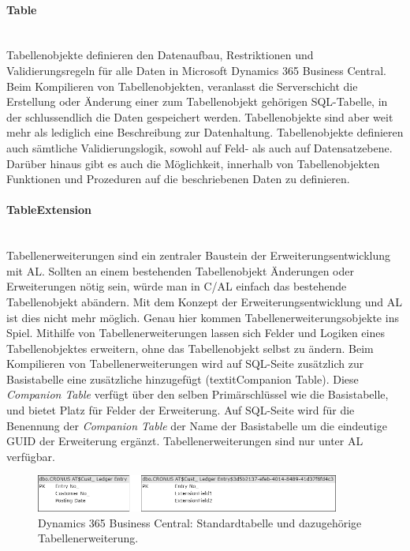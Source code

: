 \paragraph{Table}\mbox{}\\
Tabellenobjekte definieren den Datenaufbau, Restriktionen und Validierungsregeln für alle Daten in Microsoft Dynamics 365 Business Central. Beim Kompilieren von Tabellenobjekten, veranlasst die Serverschicht die Erstellung oder Änderung einer zum Tabellenobjekt gehörigen SQL-Tabelle, in der schlussendlich die Daten gespeichert werden. Tabellenobjekte sind aber weit mehr als lediglich eine Beschreibung zur Datenhaltung. Tabellenobjekte definieren auch sämtliche Validierungslogik, sowohl auf Feld- als auch auf Datensatzebene. Darüber hinaus gibt es auch die Möglichkeit, innerhalb von Tabellenobjekten Funktionen und Prozeduren auf die beschriebenen Daten zu definieren.
\linebreak

\paragraph{TableExtension}\mbox{}\\
Tabellenerweiterungen sind ein zentraler Baustein der Erweiterungsentwicklung mit AL. Sollten an einem bestehenden Tabellenobjekt Änderungen oder Erweiterungen nötig sein, würde man in C/AL einfach das bestehende Tabellenobjekt abändern. Mit dem Konzept der Erweiterungsentwicklung und AL ist dies nicht mehr möglich. Genau hier kommen Tabellenerweiterungsobjekte ins Spiel. Mithilfe von Tabellenerweiterungen lassen sich Felder und Logiken eines Tabellenobjektes erweitern, ohne das Tabellenobjekt selbst zu ändern. Beim Kompilieren von Tabellenerweiterungen wird auf SQL-Seite zusätzlich zur Basistabelle eine zusätzliche hinzugefügt (textit{Companion Table}). Diese \textit{Companion Table} verfügt über den selben Primärschlüssel wie die Basistabelle, und bietet Platz für Felder der Erweiterung. Auf SQL-Seite wird für die Benennung der \textit{Companion Table} der Name der Basistabelle um die eindeutige GUID der Erweiterung ergänzt. Tabellenerweiterungen sind nur unter AL verfügbar.
\begin{figure}[h]
	\centering
	\includegraphics[width=100mm]{images/TableExtenison}
	\caption{Dynamics 365 Business Central:  Standardtabelle und dazugehörige Tabellenerweiterung.}
	\label{fig:TableExtension}
\end{figure}

